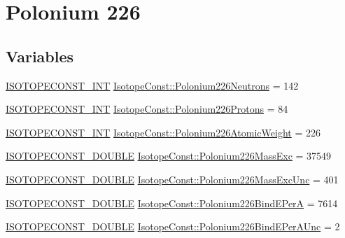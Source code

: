 \hypertarget{group___isotope_const-_polonium-_po226}{}\section{Polonium 226}
\label{group___isotope_const-_polonium-_po226}
\subsection*{Variables}
\begin{DoxyCompactItemize}
\item 
\mbox{\hyperlink{group___isotope_const-_macros_ga5f18360b3e99483a35c32d789e62621c}{I\+S\+O\+T\+O\+P\+E\+C\+O\+N\+S\+T\+\_\+\+I\+NT}} \mbox{\hyperlink{group___isotope_const-_polonium-_po226_ga2aa50c9064f07cb3fbe712a2e50bf4ee}{Isotope\+Const\+::\+Polonium226\+Neutrons}} = 142
\item 
\mbox{\hyperlink{group___isotope_const-_macros_ga5f18360b3e99483a35c32d789e62621c}{I\+S\+O\+T\+O\+P\+E\+C\+O\+N\+S\+T\+\_\+\+I\+NT}} \mbox{\hyperlink{group___isotope_const-_polonium-_po226_ga5bc152b2728947e3c326a7191160f057}{Isotope\+Const\+::\+Polonium226\+Protons}} = 84
\item 
\mbox{\hyperlink{group___isotope_const-_macros_ga5f18360b3e99483a35c32d789e62621c}{I\+S\+O\+T\+O\+P\+E\+C\+O\+N\+S\+T\+\_\+\+I\+NT}} \mbox{\hyperlink{group___isotope_const-_polonium-_po226_ga824fabd57859d8807270a1e15046a0bf}{Isotope\+Const\+::\+Polonium226\+Atomic\+Weight}} = 226
\item 
\mbox{\hyperlink{group___isotope_const-_macros_ga8f45a7272ce02c0b4c65c44636ed719a}{I\+S\+O\+T\+O\+P\+E\+C\+O\+N\+S\+T\+\_\+\+D\+O\+U\+B\+LE}} \mbox{\hyperlink{group___isotope_const-_polonium-_po226_ga3a2f10a68221071f5c2cf2ff9c5e3647}{Isotope\+Const\+::\+Polonium226\+Mass\+Exc}} = 37549
\item 
\mbox{\hyperlink{group___isotope_const-_macros_ga8f45a7272ce02c0b4c65c44636ed719a}{I\+S\+O\+T\+O\+P\+E\+C\+O\+N\+S\+T\+\_\+\+D\+O\+U\+B\+LE}} \mbox{\hyperlink{group___isotope_const-_polonium-_po226_gadc31b4ad83c338d4b0492d86a63222a0}{Isotope\+Const\+::\+Polonium226\+Mass\+Exc\+Unc}} = 401
\item 
\mbox{\hyperlink{group___isotope_const-_macros_ga8f45a7272ce02c0b4c65c44636ed719a}{I\+S\+O\+T\+O\+P\+E\+C\+O\+N\+S\+T\+\_\+\+D\+O\+U\+B\+LE}} \mbox{\hyperlink{group___isotope_const-_polonium-_po226_gaf16391c20e5e590cba4cead6fb3308f4}{Isotope\+Const\+::\+Polonium226\+Bind\+E\+PerA}} = 7614
\item 
\mbox{\hyperlink{group___isotope_const-_macros_ga8f45a7272ce02c0b4c65c44636ed719a}{I\+S\+O\+T\+O\+P\+E\+C\+O\+N\+S\+T\+\_\+\+D\+O\+U\+B\+LE}} \mbox{\hyperlink{group___isotope_const-_polonium-_po226_ga833b607e350cff2fc19b5d57a819eec6}{Isotope\+Const\+::\+Polonium226\+Bind\+E\+Per\+A\+Unc}} = 2

\end{DoxyCompactItemize}
